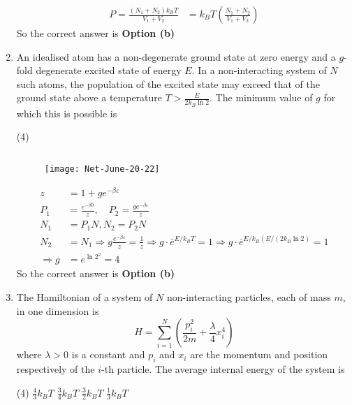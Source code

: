 \begin{enumerate}
\begin{answer}
\begin{align*}
	P=\frac{\left(N_{1}+N_{2}\right) k_{B} T}{V_{1}+V_{2}}&=k_{B} T\left(\frac{N_{1}+N_{2}}{V_{1}+V_{2}}\right)
	\end{align*}
		So the correct answer is \textbf{Option (b)}
\end{answer}
\item An idealised atom has a non-degenerate ground state at zero energy and a $g$-fold degenerate excited state of energy $E$. In a non-interacting system of $N$ such atoms, the population of the excited state may exceed that of the ground state above a temperature $T>\frac{E}{2 k_{B} \ln 2}$. The minimum value of $g$ for which this is possible is
 \begin{tasks}(4)
\end{tasks}
\begin{answer}$\left. \right. $
		\begin{figure}[H]
		\centering
		\texttt{[image: Net-June-20-22]}
	\end{figure}
	\begin{align*}
	z&=1+g e^{-\beta \varepsilon} \\
	P_{1}&=\frac{e^{-\beta 0}}{z}, \quad P_{2}=\frac{g e^{-\beta \varepsilon}}{z} \\
	N_{1}&=P_{1} N, N_{2}=P_{2} N \\
	N_{2}&=N_{1} \Rightarrow g \frac{e^{-\beta \varepsilon}}{z}=\frac{1}{z} \Rightarrow g \cdot \bar{e}^{E / k_{B} T}=1 \Rightarrow g \cdot \bar{e}^{E / k_{B}\left(E /\left(2 k_{B} \ln 2\right)\right.}=1 \\
	\Rightarrow g&=e^{\ln 2^{2}}=4
	\end{align*}
		So the correct answer is \textbf{Option (b)}
\end{answer}
\item  The Hamiltonian of a system of $N$ non-interacting particles, each of mass $m$, in one dimension is
$$
H=\sum_{i=1}^{N}\left(\frac{p_{i}^{2}}{2 m}+\frac{\lambda}{4} x_{i}^{4}\right)
$$
where $\lambda>0$ is a constant and $p_{i}$ and $x_{i}$ are the momentum and position respectively of the $i$-th particle. The average internal energy of the system is
 \begin{tasks}(4)
	\task[\textbf{a.}]$\frac{4}{3} k_{B} T$
	\task[\textbf{b.}]$\frac{3}{4} k_{B} T$
	\task[\textbf{c.}] $\frac{3}{2} k_{B} T$
	\task[\textbf{d.}] $\frac{1}{3} k_{B} T$
\end{tasks}	
\begin{answer}
	\begin{align*}

\end{align*}
\end{answer}
\end{enumerate}
